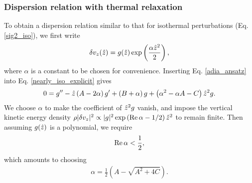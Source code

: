 \subsubsection{Dispersion relation with thermal
  relaxation}\label{disp_relax}
To obtain a dispersion relation similar to that for 
isothermal perturbations (Eq. \ref{sig2_iso}), we first write 
\begin{align}
  \delta v_z(\hat{z}) =
  g(\hat{z})\exp\left(\frac{\alpha\hat{z}^2}{2}\right), \label{adia_ansatz}
\end{align}
where $\alpha$ is a constant to be chosen for convenience. Inserting
Eq. \ref{adia_ansatz} into Eq. \ref{nearly_iso_explicit} gives
\begin{align}
  0 = g^{\prime\prime} - \hat{z}\left(A - 2\alpha\right)g^\prime + \left(B +
    \alpha\right)g
  +\left(\alpha^2 - \alpha A - C\right)\hat{z}^2 g.
\end{align}
We choose $\alpha$ to make the coefficient of $\hat{z}^2g$
vanish, and impose the vertical kinetic energy density
$\rho|\delta v_z|^2\propto |g|^2 \exp{\left(\operatorname{Re}\alpha -
    1/2\right)\hat{z}^2}$ to remain finite. Then assuming $g(\hat{z})$
is a polynomial, we require  
\begin{align}
  \operatorname{Re}\alpha < \frac{1}{2}, 
\end{align}
which amounts to choosing 
\begin{align}
  \alpha = \frac{1}{2}\left(A - \sqrt{A^2 + 4C}\right).  
\end{align} 

